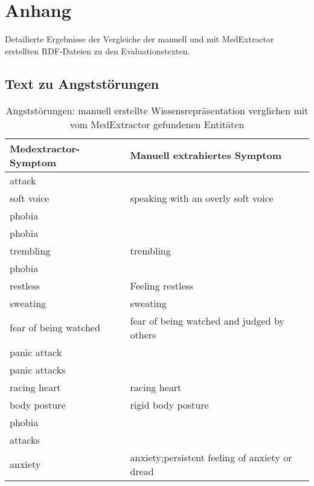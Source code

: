 %
%
\appendix
\chapter{Anhang}
\label{ch:Anhang}

Detailierte Ergebnisse der Vergleiche der manuell und mit MedExtractor erstellten RDF-Dateien zu den Evaluationstexten.

\section{Text zu Angststörungen}
\label{sec:anxietydisorders} 

\begin{table}[H]
\begin{center}
\begin{tabular}{ll}
\toprule
  Medextractor-Symptom &                       Manuell extrahiertes Symptom \\
\midrule
               attack &                                                \\
           soft voice &             speaking with an overly soft voice \\
               phobia &                                                \\
               phobia &                                                \\
            trembling &                                      trembling \\
               phobia &                                                \\
             restless &                               Feeling restless \\
             sweating &                                       sweating \\
fear of being watched &     fear of being watched and judged by others \\
         panic attack &                                                \\
        panic attacks &                                                \\
         racing heart &                                   racing heart \\
         body posture &                             rigid body posture \\
               phobia &                                                \\
              attacks &                                                \\
              anxiety & anxiety;persistent feeling of anxiety or dread \\
\bottomrule
\end{tabular}
\caption{Angststörungen: manuell erstellte Wissensrepräsentation verglichen mit vom MedExtractor gefundenen Entitäten}
\label{tab:anxietydisorders_vergleich_manuell_medextractor}
\end{center}
\end{table}


